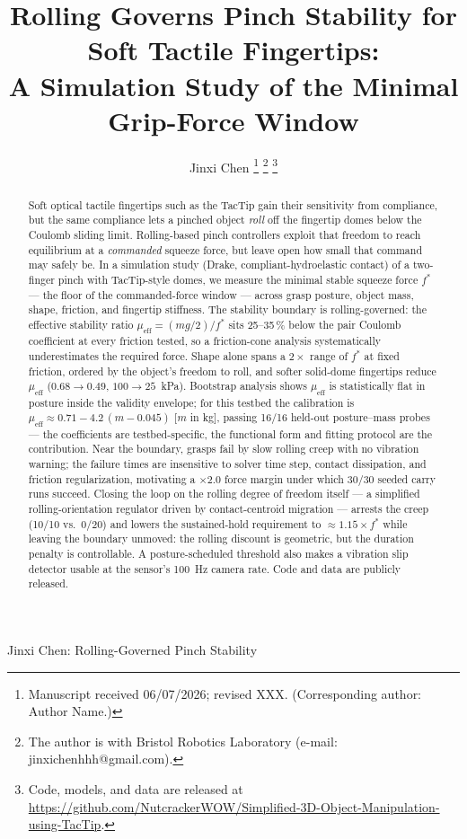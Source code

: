 \documentclass[journal]{IEEEtran}
\newcommand{\mueff}{\mu_{\mathrm{eff}}}
\newcommand{\fstar}{f^{*}}
\newcommand{\repourl}{\url{https://github.com/NutcrackerWOW/Simplified-3D-Object-Manipulation-using-TacTip}}
\begin{document}
\title{Rolling Governs Pinch Stability for Soft Tactile Fingertips:\\
  A Simulation Study of the Minimal Grip-Force Window}

\author{Jinxi Chen%
  \thanks{Manuscript received 06/07/2026; revised XXX. (Corresponding author:
    Author Name.)}%
  \thanks{The author is with Bristol Robotics Laboratory (e-mail: jinxichenhhh@gmail.com).}%
  \thanks{Code, models, and data are released at
    \protect\repourl.}%
}

%
{Jinxi Chen: Rolling-Governed Pinch Stability}

\maketitle

\begin{abstract}
Soft optical tactile fingertips such as the TacTip gain their sensitivity
from compliance, but the same compliance lets a pinched object \emph{roll}
off the fingertip domes below the Coulomb sliding limit. Rolling-based
pinch controllers exploit that freedom to reach equilibrium at a
\emph{commanded} squeeze force, but leave open how small that command may
safely be. In a simulation study (Drake, compliant-hydroelastic contact) of
a two-finger pinch with TacTip-style domes, we measure the minimal stable
squeeze force $\fstar$ --- the floor of the commanded-force window ---
across grasp posture, object mass, shape, friction, and fingertip
stiffness. The stability boundary is rolling-governed: the effective
stability ratio $\mueff = (mg/2)/\fstar$ sits 25--35\,\% below the pair
Coulomb coefficient at every friction tested, so a friction-cone analysis
systematically underestimates the required force. Shape alone spans a
$2\times$ range of $\fstar$ at fixed friction, ordered by the object's
freedom to roll, and softer solid-dome fingertips reduce $\mueff$
($0.68 \to 0.49$, $100 \to 25$~kPa). Bootstrap analysis shows $\mueff$ is
statistically flat in posture inside the validity envelope; for this
testbed the calibration is $\mueff \approx 0.71 - 4.2\,(m - 0.045)$ [$m$ in
kg], passing 16/16 held-out posture--mass probes --- the coefficients are
testbed-specific, the functional form and fitting protocol are the
contribution. Near the boundary, grasps fail by slow rolling creep with no
vibration warning; the failure times are insensitive to solver time step,
contact dissipation, and friction regularization, motivating a
$\times 2.0$ force margin under which 30/30 seeded carry runs succeed.
Closing the loop on the rolling degree of freedom itself --- a simplified
rolling-orientation regulator driven by contact-centroid migration ---
arrests the creep (10/10 vs.\ 0/20) and lowers the sustained-hold
requirement to ${\approx}1.15\times\fstar$ while leaving the boundary
unmoved: the rolling discount is geometric, but the duration penalty is
controllable. A posture-scheduled threshold also makes a vibration slip
detector usable at the sensor's 100~Hz camera rate. Code and data are
publicly released.
\end{abstract}
\end{document}
